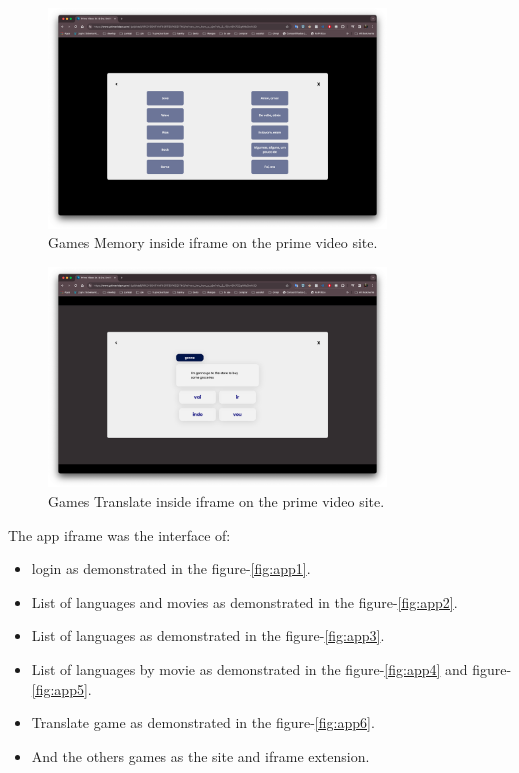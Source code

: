 \documentclass[12pt]{article}
\begin{document}
    \begin{figure}
      \centering
      \caption{
      Games Memory inside iframe on the prime video site.
      }
      \label{fig:iframe3}
      \includegraphics[width=0.8\textwidth]{assets/11.png}
    \end{figure}

    \begin{figure}
      \centering
      \caption{
      Games Translate inside iframe on the prime video site.
      }
      \label{fig:iframe4}
      \includegraphics[width=0.8\textwidth]{assets/12.png}
    \end{figure}



The app iframe was the interface of:

\begin{itemize}
  \item login as demonstrated in the figure-\ref{fig:app1}.
  \item List of languages and movies as demonstrated in the figure-\ref{fig:app2}.
  \item List of languages as demonstrated in the figure-\ref{fig:app3}.
  \item List of languages by movie as demonstrated in the figure-\ref{fig:app4} and figure-\ref{fig:app5}.
  \item Translate game as demonstrated in the figure-\ref{fig:app6}.
  \item And the others games as the site and iframe extension. 
  \end{itemize}
\end{document}
